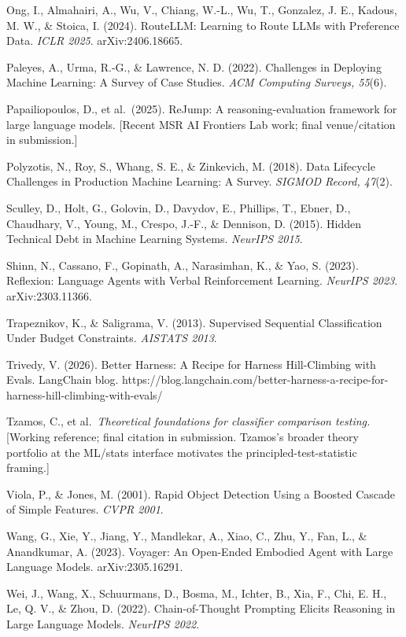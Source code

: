 Ong, I., Almahairi, A., Wu, V., Chiang, W.-L., Wu, T., Gonzalez, J. E.,
Kadous, M. W., \& Stoica, I. (2024). RouteLLM: Learning to Route LLMs
with Preference Data. \emph{ICLR 2025}. arXiv:2406.18665.

Paleyes, A., Urma, R.-G., \& Lawrence, N. D. (2022). Challenges in
Deploying Machine Learning: A Survey of Case Studies. \emph{ACM
Computing Surveys, 55}(6).

Papailiopoulos, D., et al.~(2025). ReJump: A reasoning-evaluation
framework for large language models. {[}Recent MSR AI Frontiers Lab
work; final venue/citation in submission.{]}

Polyzotis, N., Roy, S., Whang, S. E., \& Zinkevich, M. (2018). Data
Lifecycle Challenges in Production Machine Learning: A Survey.
\emph{SIGMOD Record, 47}(2).

Sculley, D., Holt, G., Golovin, D., Davydov, E., Phillips, T., Ebner,
D., Chaudhary, V., Young, M., Crespo, J.-F., \& Dennison, D. (2015).
Hidden Technical Debt in Machine Learning Systems. \emph{NeurIPS 2015}.

Shinn, N., Cassano, F., Gopinath, A., Narasimhan, K., \& Yao, S. (2023).
Reflexion: Language Agents with Verbal Reinforcement Learning.
\emph{NeurIPS 2023}. arXiv:2303.11366.

Trapeznikov, K., \& Saligrama, V. (2013). Supervised Sequential
Classification Under Budget Constraints. \emph{AISTATS 2013}.

Trivedy, V. (2026). Better Harness: A Recipe for Harness Hill-Climbing
with Evals. LangChain blog.
https://blog.langchain.com/better-harness-a-recipe-for-harness-hill-climbing-with-evals/

Tzamos, C., et al.~\emph{Theoretical foundations for classifier
comparison testing.} {[}Working reference; final citation in submission.
Tzamos's broader theory portfolio at the ML/stats interface motivates
the principled-test-statistic framing.{]}

Viola, P., \& Jones, M. (2001). Rapid Object Detection Using a Boosted
Cascade of Simple Features. \emph{CVPR 2001}.

Wang, G., Xie, Y., Jiang, Y., Mandlekar, A., Xiao, C., Zhu, Y., Fan, L.,
\& Anandkumar, A. (2023). Voyager: An Open-Ended Embodied Agent with
Large Language Models. arXiv:2305.16291.

Wei, J., Wang, X., Schuurmans, D., Bosma, M., Ichter, B., Xia, F., Chi,
E. H., Le, Q. V., \& Zhou, D. (2022). Chain-of-Thought Prompting Elicits
Reasoning in Large Language Models. \emph{NeurIPS 2022}.

